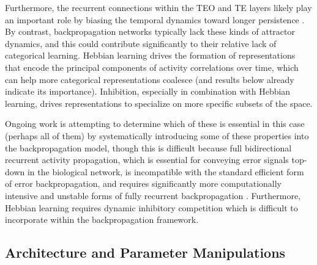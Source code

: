 \documentclass[11pt,twoside]{article}
\newif\myifpdf
\begin{document}
Furthermore, the recurrent connections within the TEO and TE layers likely play an important role by biasing the temporal dynamics toward longer persistence \citep{ChaudhuriKnoblauchGarielEtAl15}.  By contrast, backpropagation networks typically lack these kinds of attractor dynamics, and this could contribute significantly to their relative lack of categorical learning.  Hebbian learning drives the formation of representations that encode the principal components of activity correlations over time, which can help more categorical representations coalesce (and results below already indicate its importance).  Inhibition, especially in combination with Hebbian learning, drives representations to specialize on more specific subsets of the space.

Ongoing work is attempting to determine which of these is essential in this case (perhaps all of them) by systematically introducing some of these properties into the backpropagation model, though this is difficult because full bidirectional recurrent activity propagation, which is essential for conveying error signals top-down in the biological network, is incompatible with the standard efficient form of error backpropagation, and requires significantly more computationally intensive and unstable forms of fully recurrent backpropagation \citep{WilliamsZipser92,Pineda87}.  Furthermore, Hebbian learning requires dynamic inhibitory competition which is difficult to incorporate within the backpropagation framework.

\subsection{Architecture and Parameter Manipulations}
\end{document}
